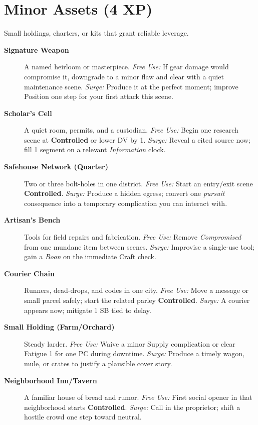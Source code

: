 \section{Minor Assets (4 XP)}
Small holdings, charters, or kits that grant reliable leverage.
\begin{description}
  \item[\textbf{Signature Weapon}]  A named heirloom or masterpiece. \emph{Free Use:} If gear damage would compromise it, downgrade to a minor flaw and clear with a quiet maintenance scene. \emph{Surge:} Produce it at the perfect moment; improve Position one step for your first attack this scene.
  \item[\textbf{Scholar’s Cell}]  A quiet room, permits, and a custodian. \emph{Free Use:} Begin one research scene at \textbf{Controlled} or lower DV by 1. \emph{Surge:} Reveal a cited source now; fill 1 segment on a relevant \emph{Information} clock.
  \item[\textbf{Safehouse Network (Quarter)}]  Two or three bolt-holes in one district. \emph{Free Use:} Start an entry/exit scene \textbf{Controlled}. \emph{Surge:} Produce a hidden egress; convert one \emph{pursuit} consequence into a temporary complication you can interact with.
  \item[\textbf{Artisan’s Bench}]  Tools for field repairs and fabrication. \emph{Free Use:} Remove \emph{Compromised} from one mundane item between scenes. \emph{Surge:} Improvise a single-use tool; gain a \emph{Boon} on the immediate Craft check.
  \item[\textbf{Courier Chain}]  Runners, dead-drops, and codes in one city. \emph{Free Use:} Move a message or small parcel safely; start the related parley \textbf{Controlled}. \emph{Surge:} A courier appears now; mitigate 1 SB tied to delay.
  \item[\textbf{Small Holding (Farm/Orchard)}]  Steady larder. \emph{Free Use:} Waive a minor Supply complication or clear Fatigue 1 for one PC during downtime. \emph{Surge:} Produce a timely wagon, mule, or crates to justify a plausible cover story.
  \item[\textbf{Neighborhood Inn/Tavern}]  A familiar house of bread and rumor. \emph{Free Use:} First social opener in that neighborhood starts \textbf{Controlled}. \emph{Surge:} Call in the proprietor; shift a hostile crowd one step toward neutral.

\end{description}
